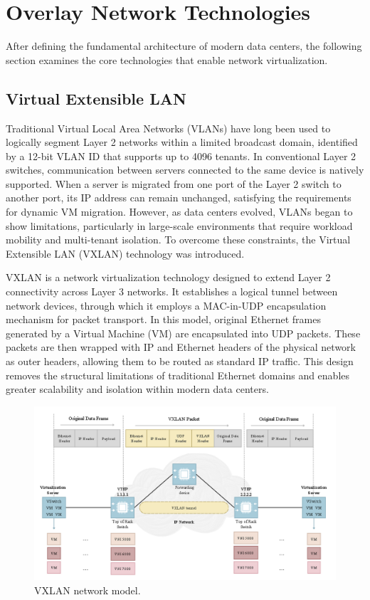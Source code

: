 \section{Overlay Network Technologies}
After defining the fundamental architecture of modern data centers, the following section examines the core technologies that enable network virtualization.

\subsection{Virtual Extensible LAN}
Traditional Virtual Local Area Networks (VLANs) have long been used to logically segment Layer 2 networks within a limited broadcast domain, identified by a 12-bit VLAN ID that supports up to 4096 tenants. In conventional Layer 2 switches, communication between servers connected to the same device is natively supported. When a server is migrated from one port of the Layer 2 switch to another port, its IP address can remain unchanged, satisfying the requirements for dynamic VM migration. However, as data centers evolved, VLANs began to show limitations, particularly in large-scale environments that require workload mobility and multi-tenant isolation. To overcome these constraints, the Virtual Extensible LAN (VXLAN) technology was introduced.

VXLAN is a network virtualization technology designed to extend Layer 2 connectivity across Layer 3 networks. It establishes a logical tunnel between network devices, through which it employs a MAC-in-UDP encapsulation mechanism for packet transport. In this model, original Ethernet frames generated by a Virtual Machine (VM) are encapsulated into UDP packets. These packets are then wrapped with IP and Ethernet headers of the physical network as outer headers, allowing them to be routed as standard IP traffic. This design removes the structural limitations of traditional Ethernet domains and enables greater scalability and isolation within modern data centers.

\begin{figure} [H]
    \centering
    \includegraphics[width=0.9\linewidth]{Figures/VXLANmodel.png}
    \caption{VXLAN network model.}
    \label{VXLANmodel}
\end{figure}

